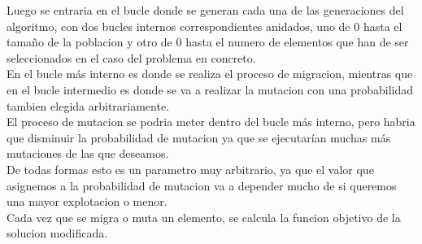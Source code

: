 \documentclass{article}
\begin{document}
Luego se entraria en el bucle donde se generan cada una de las generaciones del algoritmo, con dos bucles internos correspondientes 
anidados, uno de 0 hasta el tamaño de la poblacion y otro de 0 hasta el numero de elementos que han de ser seleccionados en 
el caso del problema en concreto.\\

En el bucle más interno es donde se realiza el proceso de migracion, mientras que en el bucle intermedio es donde 
se va a realizar la mutacion con una probabilidad tambien elegida arbitrariamente.\\

El proceso de mutacion se podria meter dentro del bucle más interno, pero habria que disminuir 
la probabilidad de mutacion ya que se ejecutarían muchas más mutaciones de las que deseamos.\\
De todas formas esto es un parametro muy arbitrario, ya que el valor que asignemos a la probabilidad de mutacion va 
a depender mucho de si queremos una mayor explotacion o menor.\\

Cada vez que se migra o muta un elemento, se calcula la funcion objetivo de la solucion modificada.\\
\end{document}
